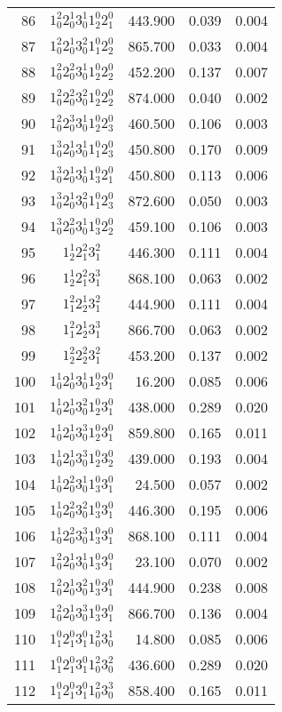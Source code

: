 \documentclass{revtex4}
\begin{document}
\begin{table}
\begin{tabular}{rcrrr}
86&$1_0^2 2_0^1 3_0^1 1_2^0 2_1^0$& 443.900& 0.039& 0.004\\
87&$1_0^2 2_0^1 3_0^2 1_1^0 2_2^0$& 865.700& 0.033& 0.004\\
88&$1_0^2 2_0^2 3_0^1 1_2^0 2_2^0$& 452.200& 0.137& 0.007\\
89&$1_0^2 2_0^2 3_0^2 1_2^0 2_2^0$& 874.000& 0.040& 0.002\\
90&$1_0^2 2_0^3 3_0^1 1_2^0 2_3^0$& 460.500& 0.106& 0.003\\
91&$1_0^3 2_0^1 3_0^1 1_1^0 2_3^0$& 450.800& 0.170& 0.009\\
92&$1_0^3 2_0^1 3_0^1 1_3^0 2_1^0$& 450.800& 0.113& 0.006\\
93&$1_0^3 2_0^1 3_0^2 1_1^0 2_3^0$& 872.600& 0.050& 0.003\\
94&$1_0^3 2_0^2 3_0^1 1_3^0 2_2^0$& 459.100& 0.106& 0.003\\
95&$1_2^1 2_1^2 3_1^2$&446.300 &0.111 &0.004\\
96&$1_2^1 2_1^2 3_1^3$&868.100 &0.063 &0.002\\
97&$1_1^2 2_2^1 3_1^2$&444.900 &0.111 &0.004\\
98&$1_1^2 2_2^1 3_1^3$&866.700 &0.063 &0.002\\
99&$1_2^2 2_2^2 3_1^2$&453.200 &0.137 &0.002\\
100&$1_0^1 2_0^1 3_0^1 1_2^0 3_1^0$& 16.200& 0.085& 0.006\\
101&$1_0^1 2_0^1 3_0^2 1_2^0 3_1^0$& 438.000& 0.289& 0.020\\
102&$1_0^1 2_0^1 3_0^3 1_2^0 3_1^0$& 859.800& 0.165& 0.011\\
103&$1_0^1 2_0^1 3_0^3 1_2^0 3_2^0$& 439.000& 0.193& 0.004\\
104&$1_0^1 2_0^2 3_0^1 1_3^0 3_1^0$& 24.500& 0.057& 0.002\\
105&$1_0^1 2_0^2 3_0^2 1_3^0 3_1^0$& 446.300& 0.195& 0.006\\
106&$1_0^1 2_0^2 3_0^3 1_3^0 3_1^0$& 868.100& 0.111& 0.004\\
107&$1_0^2 2_0^1 3_0^1 1_3^0 3_1^0$& 23.100& 0.070& 0.002\\
108&$1_0^2 2_0^1 3_0^2 1_3^0 3_1^0$& 444.900& 0.238& 0.008\\
109&$1_0^2 2_0^1 3_0^3 1_3^0 3_1^0$& 866.700& 0.136& 0.004\\
110&$1_1^0 2_1^0 3_1^0 1_0^2 3_0^1$& 14.800& 0.085& 0.006\\
111&$1_1^0 2_1^0 3_1^0 1_0^2 3_0^2$& 436.600& 0.289& 0.020\\
112&$1_1^0 2_1^0 3_1^0 1_0^2 3_0^3$& 858.400& 0.165& 0.011\\

\end{tabular}
\end{table}
\end{document}
